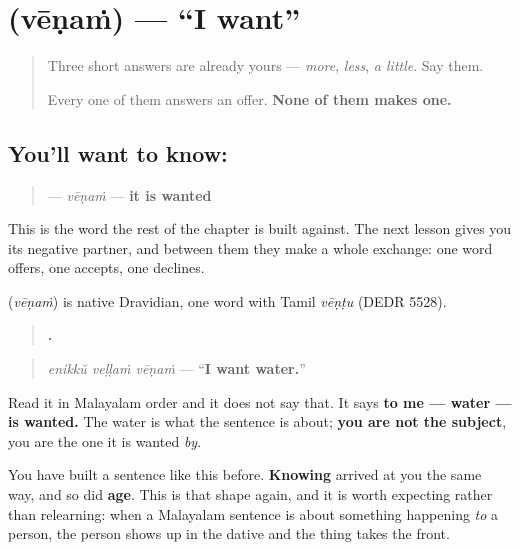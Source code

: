 \section[\texorpdfstring{\ml{വേണം} (vēṇaṁ)}{വേണം (vēṇaṁ)}]{ (vēṇaṁ) — \textquotedblleft{}I want\textquotedblright{}}

\label{lesson:ML-C58-venam}



\begin{quote}
Three short answers are already yours — \emph{more}, \emph{less}, \emph{a little}. Say them.

Every one of them answers an offer. \textbf{None of them makes one.}
\end{quote}

\subsection*{You'll want to know: }
\begin{quote}
\textbf{} — \emph{vēṇaṁ} — \textbf{it is wanted}
\end{quote}

This is the word the rest of the chapter is built against. The next lesson gives you its negative partner, and between them they make a whole exchange: one word offers, one accepts, one declines.

\begin{cousinweb}
\textbf{} (\emph{vēṇaṁ}) is native Dravidian, one word with Tamil \emph{vēṇṭu} (DEDR 5528).
\end{cousinweb}

\begin{grammarlens}[title={Grammar Lens: nobody wants anything in Malayalam}]
\begin{quote}
\textbf{  .}
\end{quote}

\begin{quote}
\emph{enikkŭ veḷḷaṁ vēṇaṁ} — \textquotedblleft{}\textbf{I want water.}\textquotedblright{}
\end{quote}

Read it in Malayalam order and it does not say that. It says \textbf{to me — water — is wanted.} The water is what the sentence is about; \textbf{you are not the subject}, you are the one it is wanted \emph{by}.

You have built a sentence like this before. \textbf{Knowing} arrived at you the same way, and so did \textbf{age}. This is that shape again, and it is worth expecting rather than relearning: when a Malayalam sentence is about something happening \emph{to} a person, the person shows up in the dative and the thing takes the front.
\end{grammarlens}

